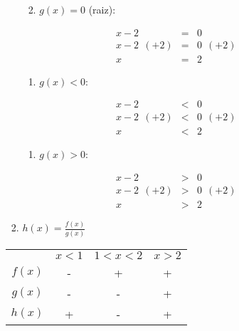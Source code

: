 \documentclass[]{book}
\providecommand{\tightlist}{%
  \setlength{\itemsep}{0pt}\setlength{\parskip}{0pt}}
\begin{document}
\begin{enumerate}
\begin{enumerate}
\begin{enumerate}
      \begin{enumerate}
      \def\labelenumiv{\Roman{enumiv})}
      \tightlist
      \item
        \(g(x) = 0\) (raiz):
      \end{enumerate}

      \begin{eqnarray}
      x-2 &=& 0 \nonumber \\
      x-2 \ \ (+2) &=& 0 \ \ (+2) \nonumber \\
      x &=& 2 \nonumber
      \end{eqnarray}

      \begin{enumerate}
      \def\labelenumiv{\Roman{enumiv})}
      \setcounter{enumiv}{1}
      \tightlist
      \item
        \(g(x) < 0\):
      \end{enumerate}

      \begin{eqnarray}
      x-2 &<& 0 \nonumber \\
      x-2 \ \ (+2) &<& 0 \ \ (+2) \nonumber \\
      x &<& 2 \nonumber
      \end{eqnarray}

      \begin{enumerate}
      \def\labelenumiv{\Roman{enumiv})}
      \setcounter{enumiv}{2}
      \tightlist
      \item
        \(g(x) > 0\):
      \end{enumerate}

      \begin{eqnarray}
      x-2 &>& 0 \nonumber \\
      x-2 \ \ (+2) &>& 0 \ \ (+2) \nonumber \\
      x &>& 2 \nonumber
      \end{eqnarray}
    \item
      \(h(x) = \frac{f(x)}{g(x)}\)
    \end{enumerate}

    \begin{table}[h]
    \centering
    \label{my-label}
    \begin{tabular}{cc|c|c}
                                & $x < 1$ & $1 < x < 2$ & $x > 2$                 \\
    \multicolumn{1}{c|}{$f(x)$} & -       & +           & \multicolumn{1}{c|}{+}  \\
    \multicolumn{1}{c|}{$g(x)$} & -       & -           & \multicolumn{1}{c|}{+}  \\
    \multicolumn{1}{c|}{$h(x)$} & +       & -           & \multicolumn{1}{c|}{+}
    \end{tabular}
    \end{table}


\end{enumerate}
\end{enumerate}
\end{document}
